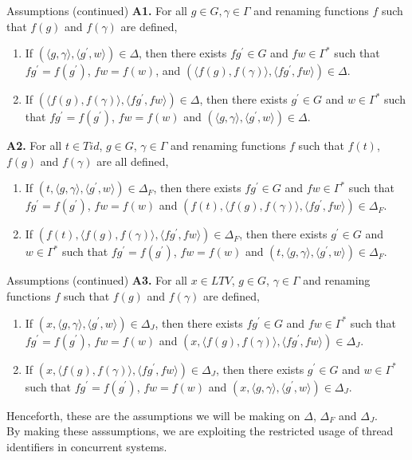 \documentclass[10pt,notheorems]{beamer}
\theoremstyle{plain} %
\begin{document}
\begin{frame}{Assumptions (continued)}
    \textbf{A1.} For all $g\in G, \gamma\in \Gamma$ and renaming functions $f$ such that $f(g)$ and $f(\gamma)$ are defined,
    \begin{enumerate}
        \item If $(\langle g,\gamma\rangle,\langle g^{\prime},w\rangle)\in \Delta$, then there exists 
        $fg^{\prime}\in G$ and $fw\in\Gamma^*$ such that $fg^{\prime}=f(g^{\prime})$, $fw=f(w)$, and
        $(\langle f(g),f(\gamma)\rangle,\langle fg^{\prime},fw\rangle)\in \Delta$.
        \item If $(\langle f(g),f(\gamma)\rangle,\langle fg^{\prime},fw\rangle)\in \Delta$, then there 
        exists $g^{\prime}\in G$ and $w\in \Gamma^*$ such that $fg^{\prime}=f(g^{\prime})$, $fw=f(w)$ and 
        $(\langle g,\gamma\rangle,\langle g^{\prime},w\rangle)\in \Delta$.
    \end{enumerate}
    \textbf{A2.} For all $t\in Tid$, $g\in G$, $\gamma\in \Gamma$ and renaming functions $f$ such that 
    $f(t)$, $f(g)$ and $f(\gamma)$ are all defined,
    \begin{enumerate}
        \item If $(t,\langle g,\gamma\rangle,\langle g^{\prime},w\rangle)\in \Delta_F$, then there exists 
        $fg^{\prime}\in G$ and $fw\in \Gamma^*$ such that $fg^{\prime}=f(g^{\prime})$, $fw=f(w)$ and 
        $(f(t),\langle f(g),f(\gamma)\rangle,\langle fg^{\prime},fw\rangle)\in\Delta_F$.
        \item If $(f(t),\langle f(g),f(\gamma)\rangle,\langle fg^{\prime},fw\rangle)\in \Delta_F$, then there 
        exists $g^{\prime}\in G$ and $w\in \Gamma^*$ such that $fg^{\prime}=f(g^{\prime})$, $fw=f(w)$ and 
        $(t,\langle g,\gamma\rangle,\langle g^{\prime},w\rangle)\in \Delta_F$.
    \end{enumerate} 
\end{frame}
\begin{frame}{Assumptions (continued)}
    \textbf{A3.} For all $x\in LTV$, $g\in G$, $\gamma\in \Gamma$ and renaming functions $f$ such that 
    $f(g)$ and $f(\gamma)$ are defined,
    \begin{enumerate}
        \item If $(x,\langle g,\gamma\rangle,\langle g^{\prime},w\rangle)\in \Delta_J$, then there exists 
        $fg^{\prime}\in G$ and $fw\in \Gamma^*$ such that $fg^{\prime}=f(g^{\prime})$, $fw=f(w)$ and 
        $(x,\langle f(g),f(\gamma)\rangle,\langle fg^{\prime},fw\rangle)\in\Delta_J$.
        \item If $(x,\langle f(g),f(\gamma)\rangle,\langle fg^{\prime},fw\rangle)\in \Delta_J$, then there 
        exists $g^{\prime}\in G$ and $w\in \Gamma^*$ such that $fg^{\prime}=f(g^{\prime})$, $fw=f(w)$ and 
        $(x,\langle g,\gamma\rangle,\langle g^{\prime},w\rangle)\in \Delta_J$.
    \end{enumerate}
    Henceforth, these are the assumptions we will be making on $\Delta$, $\Delta_F$ and $\Delta_J$.\\
    By making these asssumptions, we are exploiting the restricted usage of thread identifiers in concurrent systems.
\end{frame}
\end{document}
